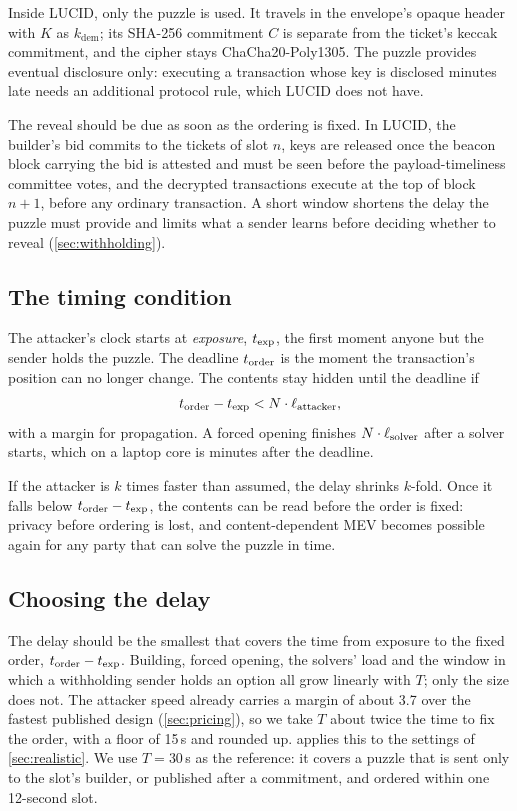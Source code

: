 Inside LUCID, only the puzzle is used. It travels in the envelope's opaque header with $K$ as $k_{\mathrm{dem}}$; its SHA-256 commitment $C$ is separate from the ticket's keccak commitment, and the cipher stays ChaCha20-Poly1305. The puzzle provides eventual disclosure only: executing a transaction whose key is disclosed minutes late needs an additional protocol rule, which LUCID does not have.

The reveal should be due as soon as the ordering is fixed. In LUCID, the builder's bid commits to the tickets of slot $n$, keys are released once the beacon block carrying the bid is attested and must be seen before the payload-timeliness committee votes, and the decrypted transactions execute at the top of block $n+1$, before any ordinary transaction. A short window shortens the delay the puzzle must provide and limits what a sender learns before deciding whether to reveal (\cref{sec:withholding}).

\subsection{The timing condition}\label{sec:timing}

The attacker's clock starts at \emph{exposure}, $t_{\mathrm{exp}}$, the first moment anyone but the sender holds the puzzle. The deadline $t_{\mathrm{order}}$ is the moment the transaction's position can no longer change. The contents stay hidden until the deadline if
\[
  t_{\mathrm{order}} - t_{\mathrm{exp}} < N \cdot \ell_{\mathrm{attacker}},
\]
with a margin for propagation. A forced opening finishes $N \cdot \ell_{\mathrm{solver}}$ after a solver starts, which on a laptop core is minutes after the deadline.

If the attacker is $k$ times faster than assumed, the delay shrinks $k$-fold. Once it falls below $t_{\mathrm{order}} - t_{\mathrm{exp}}$, the contents can be read before the order is fixed: privacy before ordering is lost, and content-dependent MEV becomes possible again for any party that can solve the puzzle in time.

\subsection{Choosing the delay}\label{sec:choosing-t}

The delay should be the smallest that covers the time from exposure to the fixed order, $t_{\mathrm{order}} - t_{\mathrm{exp}}$. Building, forced opening, the solvers' load and the window in which a withholding sender holds an option all grow linearly with $T$; only the size does not. The attacker speed already carries a margin of about 3.7 over the fastest published design (\cref{sec:pricing}), so we take $T$ about twice the time to fix the order, with a floor of 15\,s and rounded up.  applies this to the settings of \cref{sec:realistic}. We use $T = 30$\,s as the reference: it covers a puzzle that is sent only to the slot's builder, or published after a commitment, and ordered within one 12-second slot.

